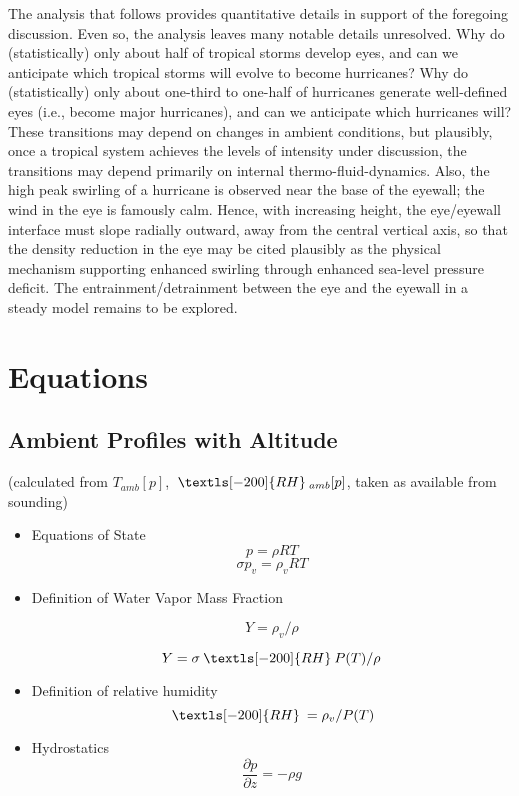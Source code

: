 \documentclass[preprint, prX]{revtex4}
\newcommand{\pd}[2]{\frac{\partial#1}{\partial#2}}
\newcommand{\rh}{\:\textls[-200]{RH}\:}
\begin{document}
The analysis that follows provides quantitative details in support of the foregoing discussion. Even so, the analysis leaves many notable details unresolved. Why do (statistically) only about half of tropical storms develop eyes, and can we anticipate which tropical storms will evolve to become hurricanes? Why do (statistically) only about one-third to one-half of hurricanes generate well-defined eyes (i.e., become major hurricanes), and can we anticipate which hurricanes will? These transitions may depend on changes in ambient conditions, but plausibly, once a tropical system achieves the levels of intensity under discussion, the transitions may depend primarily on internal thermo-fluid-dynamics. Also, the high peak swirling of a hurricane is observed near the base of the eyewall; the wind in the eye is famously calm. Hence, with increasing height, the eye/eyewall interface must slope radially outward, away from the central vertical axis, so that the density reduction in the eye may be cited plausibly as the physical mechanism supporting enhanced swirling through enhanced sea-level pressure deficit. The entrainment/detrainment between the eye and the eyewall in a steady model remains to be explored.

\section{Equations}

\subsection{Ambient Profiles with Altitude  }
(calculated from $T_{amb}[p]$, $ \rh_{amb}[p]$, taken as available from sounding)
\begin{itemize}

\item Equations of State
\begin{equation}
	p = \rho R T
\end{equation}
\begin{equation}
	\sigma p_v = \rho_v R T
\end{equation}

\item Definition of Water Vapor Mass Fraction

\begin{equation}
	Y = \rho_v / \rho
\end{equation}

\begin{equation}
	Y = \sigma \rh P(T) / \rho
\end{equation}

\item Definition of relative humidity
\begin{equation}
	\rh = \rho_v / P(T)
\end{equation}

\item Hydrostatics
\begin{equation}
	\pd{p}{z} = -\rho g
\end{equation}

\end{itemize}
\end{document}
